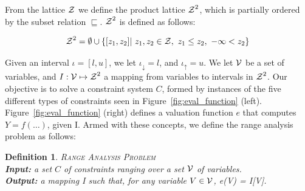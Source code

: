 \documentclass[preprint]{sigplanconf}
\newtheorem{definition}[theorem]{Definition}
\newcommand{\lb}[1]{#1_{\downarrow}}
\newcommand{\ub}[1]{#1_{\uparrow}}
\newcommand{\varset}[1]{\mbox{$\cal{#1}$}}
\begin{document}
From the lattice $\varset{Z}$ we define the product lattice
$\varset{Z}^2$, which is partially ordered by the subset relation
$\sqsubseteq$.
$\varset{Z}^2$ is defined as follows:

\begin{equation*}
\varset{Z}^2 = \emptyset \cup \{[z_1, z_2] | \ z_1,z_2 \in \varset{Z},
\ z_1 \leq z_2, \  -\infty < z_2 \}
\end{equation*}

Given an interval $\iota = [l, u]$, we let $\lb{\iota} = l$, and
$\ub{\iota} = u$.
We let \varset{V} be a set of variables, and
$I: \varset{V} \mapsto \varset{Z}^2$ a
mapping from variables to intervals in $\varset{Z}^2$.
Our objective is to solve a constraint system $C$, formed by instances of the
five different types of constraints seen in Figure~\ref{fig:eval_function}
(left).
Figure~\ref{fig:eval_function} (right) defines a valuation function $e$ that
computes $Y = f(\ldots)$, given I.
Armed with these concepts, we define the range analysis problem as follows:

\begin{definition}
\label{def:rcp}
\textsc{Range Analysis Problem} \\
\textbf{Input:} a set $C$ of constraints ranging over a set \varset{V} of
variables. \\
\textbf{Output:} a mapping I such that, for any variable
$V \in \varset{V}$, e(V) = I[V].
\end{definition}
\end{document}
